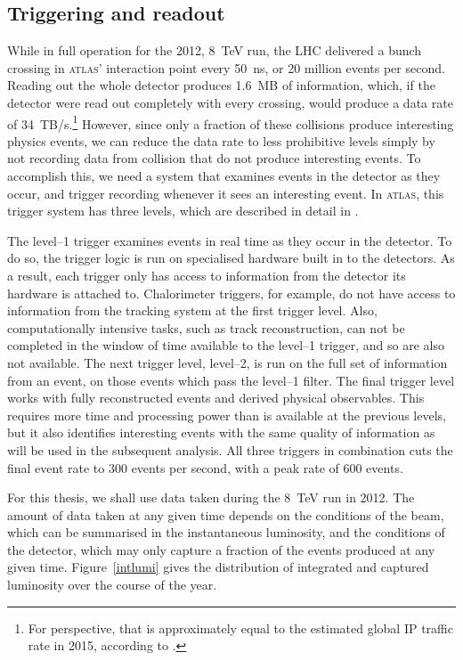 \subsection{Triggering and readout}
While in full operation for the 2012, 8~TeV run, the LHC delivered a bunch crossing in \textsc{atlas}' interaction point every 50~ns, or 20 million events per second. Reading out the whole detector produces 1.6~MB of information, which, if the detector were read out completely with every crossing, would produce a data rate of 34~TB/s.\footnote{For perspective, that is approximately equal to the estimated global IP traffic rate in 2015, according to \cite{wolframip}.} However, since only a fraction of these collisions produce interesting physics events, we can reduce the data rate to less prohibitive levels simply by not recording data from collision that do not produce interesting events. To accomplish this, we need a system that examines events in the detector as they occur, and trigger recording whenever it sees an interesting event. In \textsc{atlas}, this trigger system has three levels, which are described in detail in \cite{detectorpaper}. 

The level--1 trigger examines events in real time as they occur in the detector. To do so, the trigger logic is run on specialised hardware built in to the detectors. As a result, each trigger only has access to information from the detector its hardware is attached to. Chalorimeter triggers, for example, do not have access to information from the tracking system at the first trigger level. Also, computationally intensive tasks, such as track reconstruction, can not be completed in the window of time available to the level--1 trigger, and so are also not available. The next trigger level, level--2, is run on the full set of information from an event, on those events which pass the level--1 filter. The final trigger level works with fully reconstructed events and derived physical observables. This requires more time and processing power than is available at the previous levels, but it also identifies interesting events with the same quality of information as will be used in the subsequent analysis. All three triggers in combination cuts the final event rate to 300 events per second, with a peak rate of 600 events.

For this thesis, we shall use data taken during the 8~TeV run in 2012. The amount of data taken at any given time depends on the conditions of the beam, which can be summarised in the instantaneous luminosity, and the conditions of the detector, which may only capture a fraction of the events produced at any given time. Figure~\ref{intlumi} gives the distribution of integrated and captured luminosity over the course of the year.

